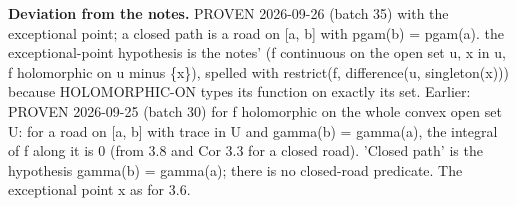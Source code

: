 %
\noindent\textbf{Deviation from the notes.} PROVEN 2026-09-26 (batch 35) with the exceptional point; a closed path is a road on [a, b] with pgam(b) = pgam(a). the exceptional-point hypothesis is the notes' (f continuous on the open set u, x in u, f holomorphic on u minus \{x\}), spelled with restrict(f, difference(u, singleton(x))) because HOLOMORPHIC-ON types its function on exactly its set. Earlier: PROVEN 2026-09-25 (batch 30) for f holomorphic on the whole convex open set U: for a road on [a, b] with trace in U and gamma(b) = gamma(a), the integral of f along it is 0 (from 3.8 and Cor 3.3 for a closed road). 'Closed path' is the hypothesis gamma(b) = gamma(a); there is no closed-road predicate. The exceptional point x as for 3.6.
%
\renewcommand{\thethm}{2.12}
\begin{prop}\label{thm:analytic-continuation}
%
\leavevmode
{}

\end{prop}
